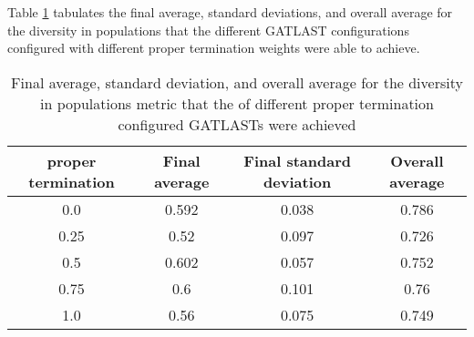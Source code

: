 Table \ref{tab:HP:GA:Livelyness:diversity in populations} tabulates the final average, standard deviations, and overall average for the diversity in populations that the different GATLAST configurations configured with different proper termination weights were able to achieve.
\begin{table}[tbh!]
\centering
\begin{adjustbox}{trim=0cm 0cm 0cm 0cm, clip=true}
\begin{tabular}{|c|c|c|c|}
\hline
proper termination & Final average & Final standard deviation & Overall average\\
\hline
0.0 & 0.592 & 0.038 & 0.786\\\hline
0.25 & 0.52 & 0.097 & 0.726\\\hline
0.5 & 0.602 & 0.057 & 0.752\\\hline
0.75 & 0.6 & 0.101 & 0.76\\\hline
1.0 & 0.56 & 0.075 & 0.749\\\hline
\end{tabular}
\end{adjustbox}
\caption{Final average, standard deviation, and overall average for the diversity in populations metric that the of different proper termination configured GATLASTs were achieved}
\label{tab:HP:GA:Livelyness:diversity in populations}
\end{table}